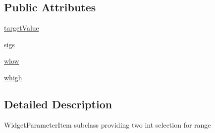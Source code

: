 \subsection*{Public Attributes}
\begin{DoxyCompactItemize}
\item 
\hyperlink{classsoftware_1_1chipwhisperer_1_1common_1_1ui_1_1ParameterTypesCustom_1_1RangeParameterItem_a5c2ede13b4438148eda31b4dd8e738f7}{target\+Value}
\item 
\hyperlink{classsoftware_1_1chipwhisperer_1_1common_1_1ui_1_1ParameterTypesCustom_1_1RangeParameterItem_a8ad50b74f2692b060deb223fe9ff74ab}{sigs}
\item 
\hyperlink{classsoftware_1_1chipwhisperer_1_1common_1_1ui_1_1ParameterTypesCustom_1_1RangeParameterItem_ae63aa839574a4cf83faf9335273bded1}{wlow}
\item 
\hyperlink{classsoftware_1_1chipwhisperer_1_1common_1_1ui_1_1ParameterTypesCustom_1_1RangeParameterItem_adce2fad23d0a6f3f58e062fec454e531}{whigh}
\end{DoxyCompactItemize}


\subsection{Detailed Description}
\begin{DoxyVerb}WidgetParameterItem subclass providing two int selection for range
\end{DoxyVerb}
 


